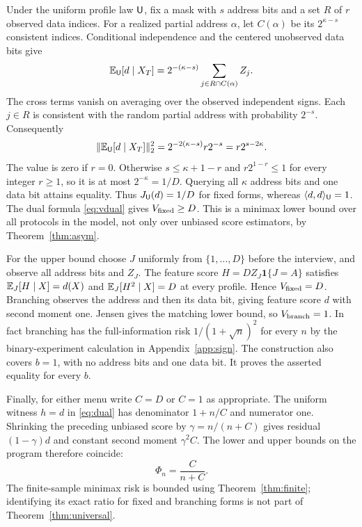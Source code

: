 Under the uniform profile law $\mathsf U$, fix a mask with $s$ address bits and a set $R$ of $r$ observed data indices. For a realized partial address $\alpha$, let $C(\alpha)$ be its $2^{\kappa-s}$ consistent indices. Conditional independence and the centered unobserved data bits give
\[
 \mathbb{E}_\mathsf U[d\mid X_T]
      =2^{-(\kappa-s)}\sum_{j\in R\cap C(\alpha)} Z_j.
\]
The cross terms vanish on averaging over the observed independent signs. Each $j\in R$ is consistent with the random partial address with probability $2^{-s}$. Consequently
\[
 \|\mathbb{E}_\mathsf U[d\mid X_T]\|_2^2
   =2^{-2(\kappa-s)} r2^{-s}=r2^{s-2\kappa}.
\]
The value is zero if $r=0$. Otherwise $s\le \kappa+1-r$ and $r2^{1-r}\le1$ for every integer $r\ge1$, so it is at most $2^{-\kappa}=1/D$. Querying all $\kappa$ address bits and one data bit attains equality. Thus $J_\mathsf U(d)=1/D$ for fixed forms, whereas $\langle d,d\rangle_\mathsf U=1$. The dual formula \eqref{eq:vdual} gives $V_{\rm fixed}\ge D$. This is a minimax lower bound over all protocols in the model, not only over unbiased score estimators, by Theorem~\ref{thm:asym}.

For the upper bound choose $J$ uniformly from $\{1,\ldots,D\}$ before the interview, and observe all address bits and $Z_J$. The feature score $H=DZ_J\mathbf1\{J=A\}$ satisfies $\mathbb{E}_J[H\mid X]=d(X)$ and $\mathbb{E}_J[H^2\mid X]=D$ at every profile. Hence $V_{\rm fixed}=D$. Branching observes the address and then its data bit, giving feature score $d$ with second moment one. Jensen gives the matching lower bound, so $V_{\rm branch}=1$. In fact branching has the full-information risk $1/(1+\sqrt n)^2$ for every $n$ by the binary-experiment calculation in Appendix~\ref{app:sign}. The construction also covers $b=1$, with no address bits and one data bit. It proves the asserted equality for every $b$.

Finally, for either menu write $C=D$ or $C=1$ as appropriate. The uniform witness $h=d$ in \eqref{eq:dual} has denominator $1+n/C$ and numerator one. Shrinking the preceding unbiased score by $\gamma=n/(n+C)$ gives residual $(1-\gamma)d$ and constant second moment $\gamma^2 C$. The lower and upper bounds on the program therefore coincide:
\[
 \Phi_n=\frac{C}{n+C}.
\]
The finite-sample minimax risk is bounded using Theorem~\ref{thm:finite}; identifying its exact ratio for fixed and branching forms is not part of Theorem~\ref{thm:universal}.
